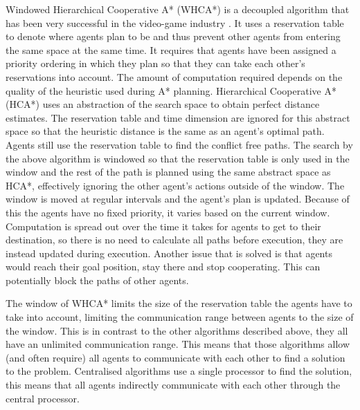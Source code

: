 Windowed Hierarchical Cooperative A* (WHCA*) is a decoupled algorithm that has
been very successful in the video-game industry \cite{silver2005}. It uses a
reservation table to denote where agents plan to be and thus prevent other
agents from entering the same space at the same time. It requires that agents
have been assigned a priority ordering in which they plan so that they can take
each other's reservations into account. The amount of computation required
depends on the quality of the heuristic used during A* planning. Hierarchical
Cooperative A* (HCA*) uses an abstraction of the search space to obtain perfect
distance estimates. The reservation table and time dimension are ignored for
this abstract space so that the heuristic distance is the same as an agent's
optimal path. Agents still use the reservation table to find the conflict free
paths.
The search by
the above algorithm is windowed so that the reservation table is only used in
the window and the rest of the path is planned using the same abstract space as
HCA*,
effectively ignoring the other agent's actions outside of the window. The
window is moved at regular intervals and the agent's plan is updated. Because
of this the agents have no fixed priority, it varies based on the current
window. Computation is spread out over the time it takes for agents to get to
their destination, so there is no need to calculate all paths before execution,
they are instead updated during execution. Another issue that is solved is that
agents would reach their goal position, stay there and stop cooperating. This
can potentially block the paths of other agents.

The window of WHCA* limits the size of the reservation table the agents have to
take into account, limiting the communication range between agents to the size
of the window. This is in contrast to the other algorithms described above,
they all have an unlimited communication range. This means that those
algorithms allow (and often require) all agents to communicate with each other
to find a solution to the problem. Centralised algorithms use a single
processor to find the solution, this means that all agents indirectly
communicate with each other through the central processor.

